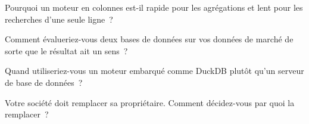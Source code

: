 \begin{interviewq}\label{iq:pl:time-series-databases-and-the-alternatives:2}
Pourquoi un moteur en colonnes est-il rapide pour les agrégations et lent pour les recherches d'une seule ligne~?
\end{interviewq}

\begin{interviewq}\label{iq:pl:time-series-databases-and-the-alternatives:3}
Comment évalueriez-vous deux bases de données sur vos données de marché de sorte que le résultat ait un sens~?
\end{interviewq}

\begin{interviewq}\label{iq:pl:time-series-databases-and-the-alternatives:4}
Quand utiliseriez-vous un moteur embarqué comme DuckDB plutôt qu'un serveur de base de données~?
\end{interviewq}

\begin{interviewq}\label{iq:pl:time-series-databases-and-the-alternatives:5}
Votre société doit remplacer sa  propriétaire. Comment décidez-vous par quoi la remplacer~?
\end{interviewq}
